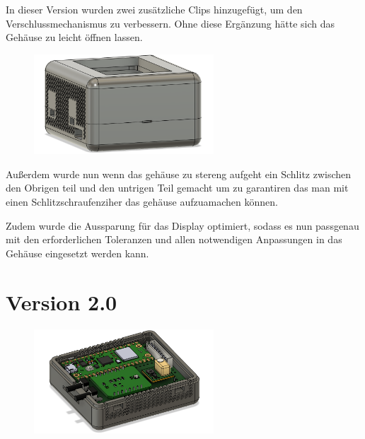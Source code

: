 \begin{inhalt}
In dieser Version wurden zwei zusätzliche Clips hinzugefügt, um den Verschlussmechanismus zu verbessern.  
Ohne diese Ergänzung hätte sich das Gehäuse zu leicht öffnen lassen.

\vspace{1cm}

\begin{figure}[!htb]
\centering
\includegraphics[width=0.6\textwidth]{files/Thomas/pics/geheause/1.2/gehaeuse_back.png}
\caption[Bildbezeichnung für Abbildungsverzeichnis]{}
\label{fig:gehaeuse_internet_bild}
\end{figure}

Außerdem wurde nun wenn das gehäuse zu stereng aufgeht ein Schlitz zwischen den Obrigen teil und den untrigen Teil gemacht um zu garantiren das man mit einen Schlitzschraufenziher das gehäuse aufzuamachen können.

\vspace{0.15cm}

Zudem wurde die Aussparung für das Display optimiert, sodass es nun passgenau mit den erforderlichen Toleranzen und allen notwendigen Anpassungen in das Gehäuse eingesetzt werden kann.

\newpage

\section{Version 2.0}

\begin{figure}[!htb]
\centering
\includegraphics[width=0.6\textwidth]{files/Thomas/pics/geheause/2.0/gehaeuse_side.png}
\caption[Bildbezeichnung für Abbildungsverzeichnis]{}
\label{fig:gehaeuse_internet_bild}
\end{figure}


\end{inhalt}
